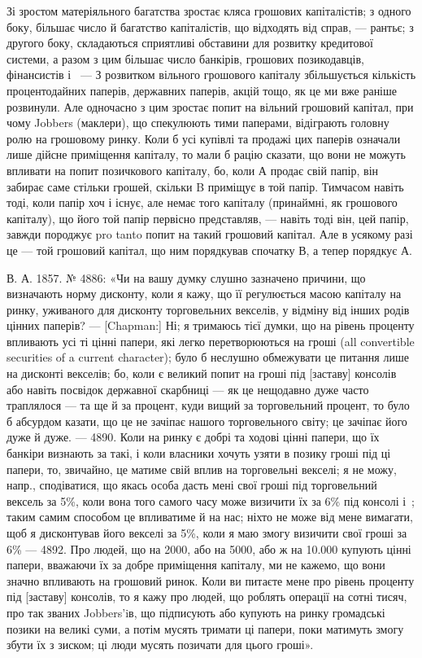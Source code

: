Зі зростом матеріяльного багатства зростає кляса грошових капіталістів;
з одного боку, більшає число й багатство капіталістів, що відходять від справ, —
рантьє; з другого боку, складаються сприятливі обставини для розвитку кредитової
системи, а разом з цим більшає число банкірів, грошових позикодавців, фінансистів
і~ — З розвитком вільного грошового капіталу збільшується кількість
процентодайних паперів, державних паперів, акцій тощо, як це ми вже раніше
розвинули. Але одночасно з цим зростає попит на вільний грошовий капітал, при
чому Jobbers (маклери), що спекулюють тими паперами, відіграють головну ролю на
грошовому ринку. Коли б усі купівлі та продажі цих паперів означали лише
дійсне приміщення капіталу, то мали б рацію сказати, що вони не можуть
впливати на попит позичкового капіталу, бо, коли А продає свій папір, він
забирає саме стільки грошей, скільки B приміщує в той папір. Тимчасом навіть
тоді, коли папір хоч і існує, але немає того капіталу (принаймні, як грошового
капіталу), що його той папір первісно представляв, — навіть тоді він, цей папір,
завжди породжує pro tanto попит на такий грошовий капітал. Але в усякому
разі це — той грошовий капітал, що ним порядкував спочатку В, а тепер
порядкує А.

В. А. 1857. № 4886: «Чи на вашу думку слушно зазначено причини,
що визначають норму дисконту, коли я кажу, що її регулюється масою капіталу
на ринку, уживаного для дисконту торговельних векселів, у відміну від
інших родів цінних паперів? — [Chapman:] Ні; я тримаюсь тієї думки, що на
рівень проценту впливають усі ті цінні папери, які легко перетворюються
на гроші (all convertible securities of a current character); було б неслушно
обмежувати це питання лише на дисконті векселів; бо, коли є великий попит
на гроші під [заставу] консолів або навіть посвідок державної скарбниці — як
це нещодавно дуже часто траплялося — та ще й за процент, куди вищий за
торговельний процент, то було б абсурдом казати, що це не зачіпає нашого торговельного
світу; це зачіпає його дуже й дуже. — 4890. Коли на ринку є добрі
та ходові цінні папери, що їх банкіри визнають за такі, і коли власники
хочуть узяти в позику гроші під ці папери, то, звичайно, це матиме свій вплив на
торговельні векселі; я не можу, напр., сподіватися, що якась особа дасть мені
свої гроші під торговельний вексель за 5\%, коли вона того самого часу може
визичити їх за 6\% під консолі і~; таким самим способом це впливатиме й на
нас; ніхто не може від мене вимагати, щоб я дисконтував його векселі за 5\%,
коли я маю змогу визичити свої гроші за 6\% — 4892. Про людей, що на 2000, або на 5000, або ж на \num{10.000} купують цінні папери, вважаючи
їх за добре приміщення капіталу, ми не кажемо, що вони значно впливають
на грошовий ринок. Коли ви питаєте мене про рівень проценту під [заставу]
консолів, то я кажу про людей, що роблять операції на сотні тисяч, про так
званих Jobbers’iв, що підписують або купують на ринку громадські позики на
великі суми, а потім мусять тримати ці папери, поки матимуть змогу збути їх
з зиском; ці люди мусять позичати для цього гроші».

